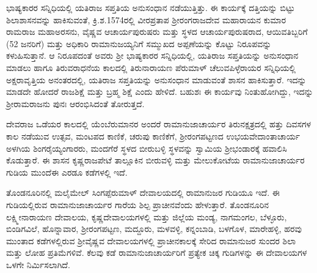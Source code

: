 \vskip 3pt

ಭಾಷ್ಯಕಾರರ ಸನ್ನಿಧಿಯಲ್ಲಿ ಯತಿರಾಜ ಸಪ್ತತಿಯ ಅನುಸಂಧಾನ ನಡೆಯುತ್ತಿತ್ತು. ಈ ಕಾರ್ಯಕ್ಕೆ ದತ್ತಿಯನ್ನು ಬಿಟ್ಟು ಶಿಲಾಶಾಸನವನ್ನು ಹಾಕಿಸುವಂತೆ, ಕ್ರಿ.ಶ.1574ರಲ್ಲಿ ವೀರಪ್ರತಾಪ ಶ‍್ರೀರಂಗರಾಜದೇವ ಮಹಾರಾಯನ ಕುಮಾರ ರಾಮರಾಜ ಮಹಾಅರಸನು, ವೈಷ್ಣವ ಆಚಾರ್ಯಪುರುಷರು ಮತ್ತು ಸ್ಥಳದ ಆಚಾರ್ಯಪುರುಷರಾದ, ಆಯಿವತಿಬ್ಬರಿಗೆ (52 ಜನರಿಗೆ) ಮತ್ತು ಅಧಿಕಾರಿ ರಾಮಾನುಜಯ್ಯನಿಗೆ ಸಮ್ಮುಖದ ಅಪ್ಪಣೆಯನ್ನು ಕೊಟ್ಟು ನಿರೂಪವನ್ನು ಕಳುಹಿಸುತ್ತಾನೆ. ಆ ನಿರೂಪದಂತೆ ಅವರು ಶ‍್ರೀ ಭಾಷ್ಯಕಾರರ ಸನ್ನಿಧಿಯಲ್ಲಿ, ಯತಿರಾಜ ಸಪ್ತತಿಯನ್ನು ಅನುಸಂಧಾನ ಮಾಡಲು ಹಾಗೂ ತಿರುವರಾಧನೆಯ ಕಾಲದಲ್ಲಿ ತಿರುನಾರಾಯಣ ಪೆರುಮಾಳ್​ ಚೆಲುವಪಿಳ್ಳೆರಾಯರ ಸನ್ನಿಧಿಯಲ್ಲಿ ಅಕ್ಷರಾವೃತ್ತಿಯ ಅನಂತರದಲ್ಲಿ, ಯತಿರಾಜ ಸಪ್ತತಿಯನ್ನು ಅನುಸಂಧಾನ ಮಾಡುವಂತೆ ಶಾಸನ ಹಾಕಿಸುತ್ತಾರೆ. ಇದನ್ನು ಮಾಡದೇ ಹೋದರೆ ರಾಜಶಿಕ್ಷೆ ಮತ್ತು ಬ್ರಹ್ಮ ಶಿಕ್ಷೆ ಎಂದು ಹೇಳಿದೆ. ಬಹುಶಃ ಈ ಕಾರ್ಯವು ನಿಂತುಹೋಗಿದ್ದು, ಇದನ್ನು ಶ‍್ರೀರಾಮರಾಜನು ಪುನಃ ಆರಂಭಿಸಿದಂತೆ ತೋರುತ್ತದೆ.

\vskip 3pt

ದೇವರಾಜ ಒಡೆಯರ ಕಾಲದಲ್ಲಿ ಯೆಂಬೆರುಮಾನರ ಅಂದರೆ ರಾಮಾನುಜಾಚಾರ್ಯರ ತಿರುನಕ್ಷತ್ರದಲ್ಲಿ ಹತ್ತು ದಿವಸಗಳ ಕಾಲ ನಡೆಯುವ ಉತ್ಸವ, ಮಂಟಪದ ಕಾಣಿಕೆ, ಚರುಪು ಕಾಣಿಕೆಗೆ, ಶ‍್ರೀರಂಗಪಟ್ಟಣದ ಉಭಯವೇದಾಂತಾಚಾರ್ಯ ಅಳಗಿಯ ಶಿಂಗರೈಯ್ಯಂಗಾರರು, ಮಂದಗೆರೆ ಸ್ಥಳದ ಬೀರುಬಳ್ಳಿ ಸ್ಥಳವನ್ನು ಸ್ವಾಮಿಯ ಶ‍್ರೀಭಂಡಾರಕ್ಕೆ ಹವಾಲಿಸಿ ಕೊಡುತ್ತಾರೆ. ಈ ಶಾಸನ ಕೃಷ್ಣರಾಜಪೇಟೆ ತಾಲ್ಲೂಕಿನ ಬೀರುವಳ್ಳಿ ಮತ್ತು ಮೇಲುಕೋಟೆಯ ರಾಮಾನುಜಾಚಾರ್ಯರ ಗುಡಿಯ ಮುಂದೆ\break ಈ ಎರಡೂ ಕಡೆಗಳಲ್ಲಿ ಇದೆ.

ತೊಂಡನೂರಿನಲ್ಲಿ ಮಲೈಮೇಲ್​ ಸಿಂಗಪ್ಪೆರುಮಾಳ್​ ದೇವಾಲಯದಲ್ಲಿ ರಾಮಾನುಜರ ಗುಡಿಯೂ ಇದೆ. ಈ ಗುಡಿಯಲ್ಲಿರುವ ರಾಮಾನುಜಾಚಾರ್ಯರ ಗಾರೆಯ ಶಿಲ್ಪ ಪ್ರಾಚೀನವೆಂದು ಹೇಳುತ್ತಾರೆ. ತೊಂಡನೂರಿನ ಲಕ್ಷ್ಮೀನಾರಾಯಣ ದೇವಾಲಯ, ಕೃಷ್ಣದೇವಾಲಯಗಳಲ್ಲಿ ಮತ್ತು ಜಿಲ್ಲೆಯ ಮಂಡ್ಯ, ನಾಗಮಂಗಲ, ಬೆಳ್ಳೂರು, ಬಿಂಡಿಗವಿಲೆ, ಹೊನ್ನಾವಾರ, ಶ‍್ರೀರಂಗಪಟ್ಟಣ, ಮದ್ದೂರು, ಮಳವಳ್ಳಿ, ಕನ್ನಂಬಾಡಿ, ಬಳಗೊಳ, ಮಾರೇಹಳ್ಳಿ, ಹರವು ಮುಂತಾದ ಕಡೆಗಳಲ್ಲಿರುವ ಶ‍್ರೀವೈಷ್ಣವ ದೇವಾಲಯಗಳಲ್ಲಿ ಪ್ರಾಚೀನಕಾಲಕ್ಕೆ ಸೇರಿದ ರಾಮಾನುಜರ ಸುಂದರ ಶಿಲಾ ಮತ್ತು ಲೋಹ ಪ್ರತಿಮೆಗಳಿವೆ. ಕೆಲವು ಕಡೆ ರಾಮಾನುಜಾಚಾರ್ಯರಿಗೆ ಪ್ರತ್ಯೇಕ ಚಿಕ್ಕ ಗುಡಿಗಳನ್ನು ಈ ದೇವಾಲಯಗಳ ಒಳಗೇ ನಿರ್ಮಿಸಲಾಗಿದೆ.

